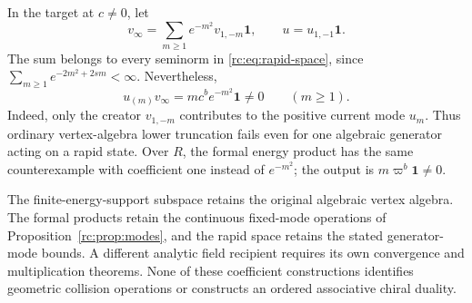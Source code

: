 \begin{example}\label{rc:ex:truncation}
In the target at \(c\ne0\), let
\[
 v_\infty=\sum_{m\geq1}e^{-m^2}v_{1,-m}\mathbf1,\qquad
 u=u_{1,-1}\mathbf1.
\]
The sum belongs to every seminorm in
\eqref{rc:eq:rapid-space}, since
\(\sum_{m\geq1}e^{-2m^2+2sm}<\infty\).
Nevertheless,
\begin{equation}\label{rc:eq:truncation}
 u_{(m)}v_\infty=mc^b e^{-m^2}\mathbf1\ne0
                       \qquad(m\geq1).
\end{equation}
Indeed, only the creator \(v_{1,-m}\) contributes to the
positive current mode \(u_m\).
Thus ordinary vertex-algebra lower truncation fails even
for one algebraic generator acting on a rapid state.
Over \(R\), the formal energy product has the same
counterexample with coefficient one instead of \(e^{-m^2}\);
the output is \(m\varpi^b\mathbf1\ne0\).
\end{example}

The finite-energy-support subspace retains the original
algebraic vertex algebra.  The formal products retain the
continuous fixed-mode operations of
Proposition~\ref{rc:prop:modes}, and the rapid space
retains the stated generator-mode bounds.
A different analytic field recipient requires its own
convergence and multiplication theorems.
None of these coefficient constructions identifies
geometric collision operations or constructs an ordered
associative chiral duality.
